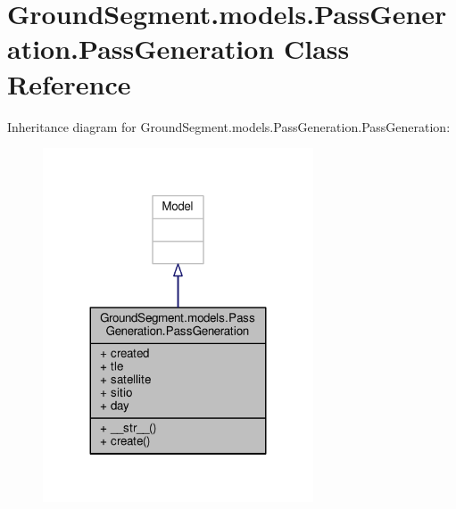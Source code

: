 \hypertarget{class_ground_segment_1_1models_1_1_pass_generation_1_1_pass_generation}{}\section{Ground\+Segment.\+models.\+Pass\+Generation.\+Pass\+Generation Class Reference}
\label{class_ground_segment_1_1models_1_1_pass_generation_1_1_pass_generation}


Inheritance diagram for Ground\+Segment.\+models.\+Pass\+Generation.\+Pass\+Generation\+:\nopagebreak
\begin{figure}[H]
\begin{center}
\leavevmode
\includegraphics[width=227pt]{class_ground_segment_1_1models_1_1_pass_generation_1_1_pass_generation__inherit__graph}
\end{center}
\end{figure}


